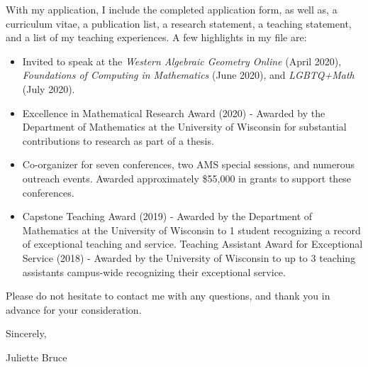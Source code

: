 \documentclass[12pt,letterpaper]{letter} %
\def\Who{Juliette Bruce} %
\begin{document}
\begin{letter}{\vspace{-1cm}}
With my application, I include the completed application form, as well as, a curriculum vitae, a publication list, a research statement,  a teaching statement, and a list of my teaching experiences. A few highlights in my file are:
\begin{itemize}
\item Invited to speak at the \textit{Western Algebraic Geometry Online} (April 2020), \textit{Foundations of Computing in Mathematics} (June 2020), and \textit{LGBTQ+Math} (July 2020).

\item Excellence in Mathematical Research Award (2020) - Awarded by the Department of Mathematics at the University of Wisconsin for substantial contributions to research as part of a thesis. 

\item Co-organizer for seven conferences, two AMS special sessions, and numerous outreach events. Awarded approximately \$55,000 in grants to support these conferences.  

\item Capstone Teaching Award (2019) - Awarded by the Department of Mathematics at the University of Wisconsin to 1 student recognizing a record of exceptional teaching and service. Teaching Assistant Award for Exceptional Service  (2018) - Awarded by the University of Wisconsin to up to 3 teaching assistants campus-wide recognizing their exceptional service.
\end{itemize}

Please do not hesitate to contact me with any questions, and thank you in advance for your consideration.

\closing{Sincerely,}
\Who{}




\end{letter}
\end{document}
